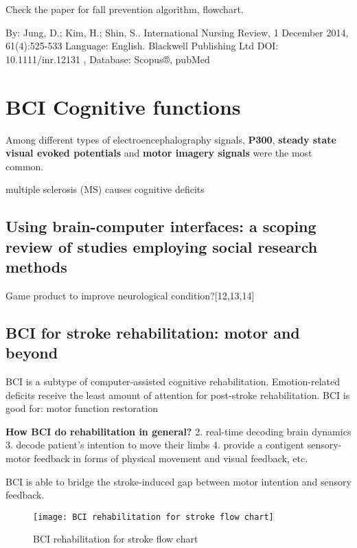 \documentclass{article}
\begin{document}
Check the paper for fall prevention algorithm, flowchart\cite{Jung_2014}.

By: Jung, D.; Kim, H.; Shin, S.. International Nursing Review, 1 December 2014, 61(4):525-533 Language: English. Blackwell Publishing Ltd 
DOI: 10.1111/inr.12131 , Database: Scopus®, pubMed


\section{BCI Cognitive functions}

Among different types of electroencephalography signals, \textbf{P300}, \textbf{steady state visual evoked potentials} and \textbf{motor imagery signals} were the most common. 

multiple sclerosis (MS) causes cognitive deficits \cite{Argento_2019}

\subsection{Using brain-computer interfaces: a scoping review of studies employing social research methods}

Game product to improve neurological condition?[12,13,14]


\subsection{BCI for stroke rehabilitation: motor and beyond}

BCI is a subtype of computer-assisted cognitive rehabilitation. Emotion-related deficits receive the least amount of attention for post-stroke rehabilitation. 
BCI is good for: motor function restoration \par
\textbf{How BCI do rehabilitation in general?}
2. real-time decoding brain dynamics 
3. decode patient's intention to move their limbs
4. provide a contigent sensory-motor feedback in forms of physical movement and visual feedback, etc.\par

BCI is able to bridge the stroke-induced gap between motor intention and sensory feedback.

\begin{figure}[!ht]
	\texttt{[image: BCI rehabilitation for stroke flow chart]}
	\centering
    \caption{BCI rehabilitation for stroke flow chart}
    
    \label{fig:BCI cog1}
\end{figure}
    
\end{document}
